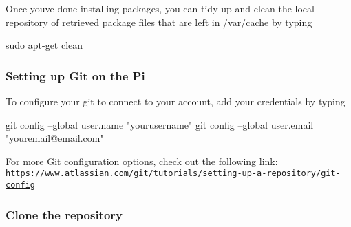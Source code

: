Once you\textquotesingle{}ve done installing packages, you can tidy up and clean the local repository of retrieved package files that are left in /var/cache by typing 
\begin{DoxyCode}
sudo apt-get clean
\end{DoxyCode}


\subsubsection*{Setting up Git on the Pi}

To configure your git to connect to your account, add your credentials by typing 
\begin{DoxyCode}
git config --global user.name "yourusername"
git config --global user.email "youremail@email.com"
\end{DoxyCode}
 For more Git configuration options, check out the following link\+: \href{https://www.atlassian.com/git/tutorials/setting-up-a-repository/git-config}{\tt https\+://www.\+atlassian.\+com/git/tutorials/setting-\/up-\/a-\/repository/git-\/config}

\subsubsection*{Clone the repository}

